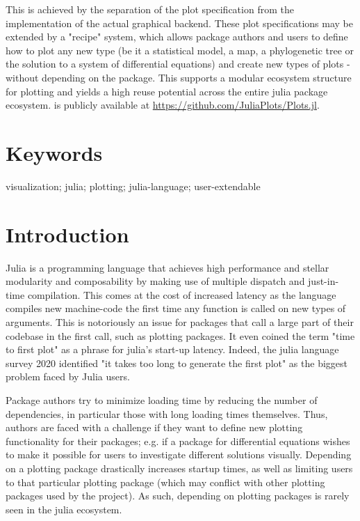 \documentclass[a4paper]{article}
\begin{document}
This is achieved by the separation of the plot specification from the implementation of the actual graphical backend.
These plot specifications may be extended by a "recipe" system, which allows package authors and users to define how to plot any new type (be it a statistical model, a map, a phylogenetic tree or the solution to a system of differential equations) and create new types of plots - without depending on the \Plots package.
This supports a modular ecosystem structure for plotting and yields a high reuse potential across the entire julia package ecosystem.
\Plots is publicly available at \url{https://github.com/JuliaPlots/Plots.jl}.

\section*{Keywords}

visualization; julia; plotting; julia-language; user-extendable

\section*{Introduction}


Julia\cite{bezansonJuliaFreshApproach2017a} is a programming language that achieves high performance and stellar modularity and composability by making use of multiple dispatch and just-in-time compilation.
This comes at the cost of increased latency as the language compiles new machine-code the first time any function is called on new types of arguments.
This is notoriously an issue for packages that call a large part of their codebase in the first call, such as plotting packages.
It even coined the term "time to first plot" as a phrase for julia's start-up latency.
Indeed, the julia language survey 2020\cite{shah2020JuliaUser} identified "it takes too long to generate the first plot" as the biggest problem faced by Julia users.

Package authors try to minimize loading time by reducing the number of dependencies, in particular those with long loading times themselves.
Thus, authors are faced with a challenge if they want to define new plotting functionality for their packages; e.g. if a package for differential equations wishes to make it possible for users to investigate different solutions visually.
Depending on a plotting package drastically increases startup times, as well as limiting users to that particular plotting package (which may conflict with other plotting packages used by the project).
As such, depending on plotting packages is rarely seen in the julia ecosystem.
\end{document}
